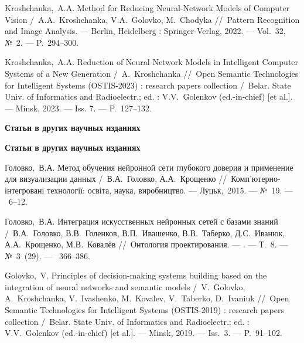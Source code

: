 Kroshchanka,~A.A. Method for Reducing Neural-Network Models of Computer Vision /~A.A.~Kroshchanka, V.A.~Golovko, M.~Chodyka
\newblock //~Pattern Recognition and Image Analysis. ---
\newblock Berlin, Heidelberg : Springer-Verlag, 2022. ---
\newblock Vol.~32, №~2. ---
\newblock P.~294--300.

Kroshchanka,~A.A. Reduction of Neural Network Models in Intelligent Computer Systems of a New Generation /~A.~Kroshchanka
\newblock //~Open Semantic Technologies for Intelligent Systems (OSTIS-2023) : research papers collection
\newblock /~Belar. State Univ. of Informatics and Radioelectr.; ed. : V.V.~Golenkov (ed.-in-chief) [et al.]. ---
\newblock Minsk, 2023. ---
\newblock Iss. 7. ---
\newblock P.~127--132.

\ifx\isabstract\undefined 
\begin{center}
\vspace{3mm}
{\bf Статьи в других научных изданиях}
\vspace{3mm}
\end{center}
\else
\vspace{2mm}
{\bf Статьи в других научных изданиях}
\vspace{2mm}
\fi

Головко,~В.А. Метод обучения нейронной сети глубокого доверия и применение для визуализации данных /~В.А.~Головко, А.А.~Крощенко
\newblock //~Комп'ютерно-інтегровані технології: освіта, наука, виробництво. ---
\newblock Луцьк,~2015. ---
\newblock №~19. ---
~6--12.

Головко,~В.А. Интеграция искусственных нейронных сетей с базами знаний /~В.А.~Головко, В.В.~Голенков, В.П.~Ивашенко, В.В.~Таберко, Д.С.~Иванюк, А.А.~Крощенко, М.В.~Ковалёв
\newblock //~Онтология проектирования. ---
. ---
\newblock Т.~8. ---
\newblock №~3~(29). ---
~366--386.

Golovko,~V. Principles of decision-making systems building based on the integration of neural networks and semantic models /~V.~Golovko, A.~Kroshchanka, V.~Ivashenko, M.~Kovalev, V.~Taberko, D.~Ivaniuk
\newblock //~Open Semantic Technologies for Intelligent Systems (OSTIS-2019) : research papers collection
\newblock /~Belar. State Univ. of Informatics and Radioelectr.; ed. : V.V.~Golenkov (ed.-in-chief) [et al.]. ---
\newblock Minsk, 2019. ---
\newblock Iss.~3. ---
\newblock P.~91--102.

